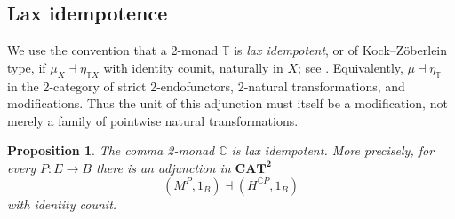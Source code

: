 \documentclass[11pt]{article}
\theoremstyle{plain}
\newtheorem{proposition}[theorem]{Proposition}
\theoremstyle{definition}
\theoremstyle{remark}
\newcommand{\CAT}{\mathbf{CAT}}
\newcommand{\C}{\mathbb{C}}
\numberwithin{equation}{section}
\begin{document}
\subsection{Lax idempotence}

We use the convention that a 2-monad $\mathbb T$ is \emph{lax
idempotent}, or of Kock--Z\"oberlein type, if
$\mu_X\dashv\eta_{\mathbb T X}$ with identity counit, naturally in
$X$; see \citet{Zoberlein1976,Kock1995}.
Equivalently, $\mu\dashv\eta_{\mathbb T}$ in the 2-category of strict
2-endofunctors, 2-natural transformations, and modifications.  Thus
the unit of this adjunction must itself be a modification, not merely a
family of pointwise natural transformations.

\begin{proposition}\label{prop:kz}
The comma 2-monad $\C$ is lax idempotent.  More precisely, for every
$P\colon E\to B$ there is an adjunction in $\CAT^{\mathbf 2}$
\begin{equation}
(M^{P},1_B)\dashv(H^{\C P},1_B)
  \label{eq:kz-adjunction}
\end{equation}
with identity counit.
\end{proposition}
\end{document}
